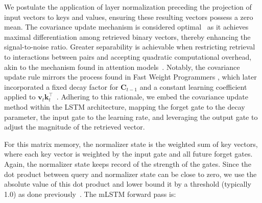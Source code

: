 We postulate the application of layer normalization preceding the projection of input vectors to keys and values, ensuring these resulting vectors possess a zero mean. The covariance update mechanism is considered optimal~\citep{Dayan:91} as it achieves maximal differentiation among retrieved binary vectors, thereby enhancing the signal-to-noise ratio. Greater separability is achievable when restricting retrieval to interactions between pairs and accepting quadratic computational overhead, akin to the mechanism found in attention models~\citep{Krotov:16,Krotov:17,Ramsauer:21}. Notably, the covariance update rule mirrors the process found in Fast Weight Programmers \citep{Schmidhuber:92ncfastweights,Schlag:21}, which later incorporated a fixed decay factor for $\mathbf{C}_{t-1}$ and a constant learning coefficient applied to 
$\mathbf{v}_{t} \mathbf{k}_t ^\top$~\citep{Ba:16}. Adhering to this rationale, we embed the covariance update method within the LSTM architecture, mapping the forget gate to the decay parameter, the input gate to the learning rate, and leveraging the output gate to adjust the magnitude of the retrieved vector.

For this matrix memory, the normalizer state is the weighted sum of key vectors, where each key vector is weighted by the input gate and all future forget gates. Again, the normalizer state keeps record of the strength of the gates. Since the dot product between query and normalizer state can be close to zero, we use the absolute value of this dot product and lower bound it by a threshold (typically 1.0) as done previously~\citep{Sun:23arxiv}. The mLSTM forward pass is:

